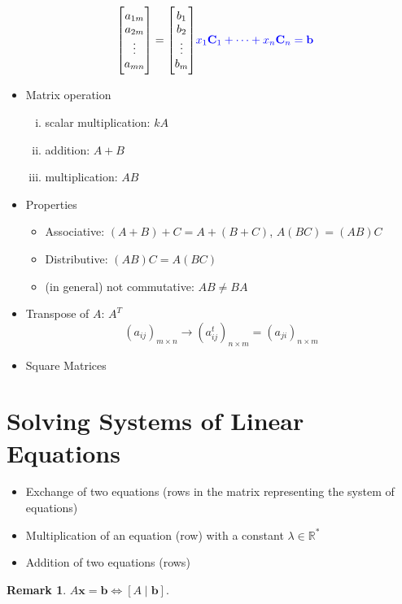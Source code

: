 \documentclass[12pt,openany]{book}
\theoremstyle{definition}
\newtheorem{remark}{Remark}[chapter]
\newcommand{\R}{\mathbb{R}}
\begin{document}
\begin{itemize}
\begin{align*}
\begin{bmatrix}
				a_{1m}\\ a_{2m}\\ \vdots\\ a_{mn}
			\end{bmatrix}=\begin{bmatrix}
				b_1\\ b_2\\ \vdots\\ b_{m} 
			\end{bmatrix} & \textcolor{blue}{x_1\textbf{C}_1+\cdots+x_n\textbf{C}_n=\textbf{b}}
		\end{align*}
		\item Matrix operation
		\begin{enumerate}[(i)]
			\item scalar multiplication: $kA$
			\item addition: $A+B$
			\item multiplication: $AB$
		\end{enumerate}
		\item Properties \begin{itemize}
			\item Associative: $(A+B)+C=A+(B+C)$, $A(BC)=(AB)C$
			\item Distributive: $(AB)C=A(BC)$
			\item (in general) not commutative: $AB\neq BA$
		\end{itemize}
		\item Transpose of $A$: $A^T$ \[
		(a_{ij})_{m\times n}\longrightarrow(a^t_{ij})_{n\times m}=(a_{ji})_{n\times m}
		\]
		\item Square Matrices
	\end{itemize}
	
	\section{Solving Systems of Linear Equations}
	\begin{itemize}
		\item Exchange of two equations (rows in the matrix representing the system
		of equations)
		\item Multiplication of an equation (row) with a constant $\lambda\in\R^*$
		\item Addition of two equations (rows)
	\end{itemize}
	
	\begin{remark}
		$A\textbf{x}=\textbf{b}\iff[A\mid\textbf{b}]$.
	\end{remark}
	
\end{document}
